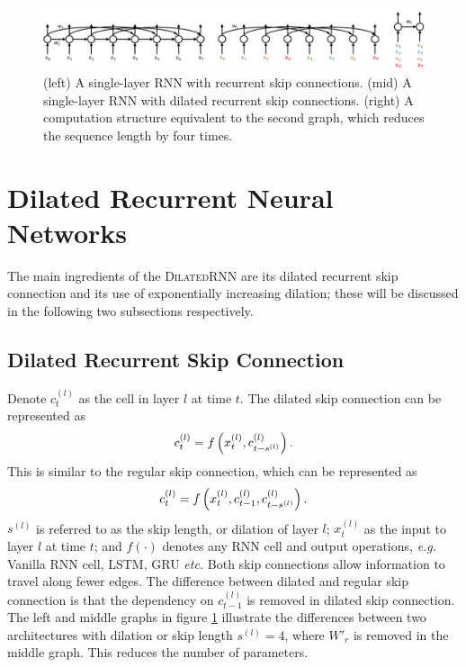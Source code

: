 \documentclass{article}
\newcommand{\algname}{\textsc{DilatedRNN }}
\begin{document}
\begin{figure}[t]
  \centering
  \includegraphics[width=1\textwidth]{./figure/drnn_illustration.pdf}
  \vspace*{-0.2in}
  \caption{(left) A single-layer RNN with recurrent skip connections. (mid) A single-layer RNN with dilated recurrent skip connections. (right) A computation structure equivalent to the second graph, which reduces the sequence length by four times.}
  \label{fig:skip-dilated-comparision}
  \vspace*{-0.15in}
\end{figure}

\section{Dilated Recurrent Neural Networks}
\label{sect:drnn}
The main ingredients of the \algname are its dilated recurrent skip connection and its use of exponentially increasing dilation; these will be discussed in the following two subsections respectively.
\subsection{Dilated Recurrent Skip Connection}
\label{subsec:dilated_skip}

Denote {\small$c_t^{(l)}$} as the cell in layer $l$ at time $t$. The dilated skip connection can be represented as
\begin{equation}
\small
c_t^{(l)} = f \left( x_t^{(l)}, c_{t-s^{(l)}}^{(l)} \right).
\label{eq:dilated_skip}
\end{equation}
This is similar to the regular skip connection\cite{el1995hierarchical, zhang2016architectural}, which can be represented as
\begin{equation}
\small
c_t^{(l)} = f \left( x_t^{(l)}, c_{t-1}^{(l)}, c_{t-s^{(l)}}^{(l)} \right).
\label{eq:rnn}
\end{equation}
{\small$s^{(l)}$} is referred to as the skip length, or dilation of layer $l$; {\small$x_t^{(l)}$} as the input to layer $l$ at time $t$; and $f(\cdot)$ denotes any RNN cell and output operations, \emph{e.g.} Vanilla RNN cell, LSTM, GRU {\em etc.}  Both skip connections allow information to travel along fewer edges. The difference between dilated and regular skip connection is that the dependency on {\small$c_{t-1}^{(l)}$} is removed in dilated skip connection. The left and middle graphs in figure \ref{fig:skip-dilated-comparision} illustrate the differences between two architectures with dilation or skip length {\small$s^{(l)} = 4$}, where $W'_r$ is removed in the middle graph. This reduces the number of parameters.  
\end{document}
